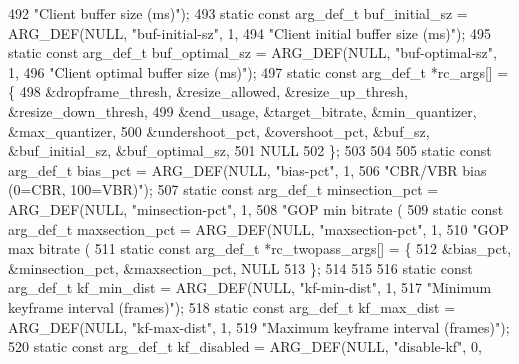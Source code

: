 \begin{DoxyCodeInclude}
{{{{{{{492                                                     \textcolor{stringliteral}{"Client buffer size (ms)"});
493 \textcolor{keyword}{static} \textcolor{keyword}{const} arg\_def\_t buf\_initial\_sz     = ARG\_DEF(NULL, \textcolor{stringliteral}{"buf-initial-sz"}, 1,
494                                                     \textcolor{stringliteral}{"Client initial buffer size (ms)"});
495 \textcolor{keyword}{static} \textcolor{keyword}{const} arg\_def\_t buf\_optimal\_sz     = ARG\_DEF(NULL, \textcolor{stringliteral}{"buf-optimal-sz"}, 1,
496                                                     \textcolor{stringliteral}{"Client optimal buffer size (ms)"});
497 \textcolor{keyword}{static} \textcolor{keyword}{const} arg\_def\_t *rc\_args[] = \{
498   &dropframe\_thresh, &resize\_allowed, &resize\_up\_thresh, &resize\_down\_thresh,
499   &end\_usage, &target\_bitrate, &min\_quantizer, &max\_quantizer,
500   &undershoot\_pct, &overshoot\_pct, &buf\_sz, &buf\_initial\_sz, &buf\_optimal\_sz,
501   NULL
502 \};
503 
504 
505 \textcolor{keyword}{static} \textcolor{keyword}{const} arg\_def\_t bias\_pct = ARG\_DEF(NULL, \textcolor{stringliteral}{"bias-pct"}, 1,
506                                           \textcolor{stringliteral}{"CBR/VBR bias (0=CBR, 100=VBR)"});
507 \textcolor{keyword}{static} \textcolor{keyword}{const} arg\_def\_t minsection\_pct = ARG\_DEF(NULL, \textcolor{stringliteral}{"minsection-pct"}, 1,
508                                                 \textcolor{stringliteral}{"GOP min bitrate (%
509 \textcolor{keyword}{static} \textcolor{keyword}{const} arg\_def\_t maxsection\_pct = ARG\_DEF(NULL, \textcolor{stringliteral}{"maxsection-pct"}, 1,
510                                                 \textcolor{stringliteral}{"GOP max bitrate (%
511 \textcolor{keyword}{static} \textcolor{keyword}{const} arg\_def\_t *rc\_twopass\_args[] = \{
512   &bias\_pct, &minsection\_pct, &maxsection\_pct, NULL
513 \};
514 
515 
516 \textcolor{keyword}{static} \textcolor{keyword}{const} arg\_def\_t kf\_min\_dist = ARG\_DEF(NULL, \textcolor{stringliteral}{"kf-min-dist"}, 1,
517                                              \textcolor{stringliteral}{"Minimum keyframe interval (frames)"});
518 \textcolor{keyword}{static} \textcolor{keyword}{const} arg\_def\_t kf\_max\_dist = ARG\_DEF(NULL, \textcolor{stringliteral}{"kf-max-dist"}, 1,
519                                              \textcolor{stringliteral}{"Maximum keyframe interval (frames)"});
520 \textcolor{keyword}{static} \textcolor{keyword}{const} arg\_def\_t kf\_disabled = ARG\_DEF(NULL, \textcolor{stringliteral}{"disable-kf"}, 0,
}}}}}}}}}
\end{DoxyCodeInclude}
